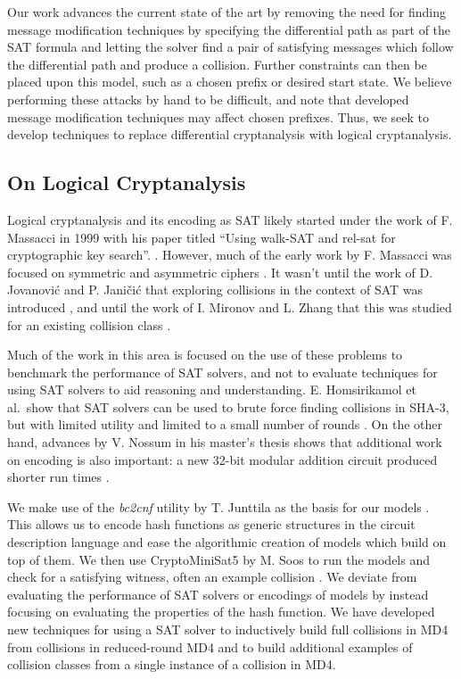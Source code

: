 \documentclass[conference]{IEEEtran}
\begin{document}
Our work advances the current state of the art by removing the need for finding message modification techniques by
specifying the differential path as part of the SAT formula and letting the
solver find a pair of satisfying messages which follow the differential path
and produce a collision. Further constraints can then be placed upon this
model, such as a chosen prefix or desired start state. We believe performing
these attacks by hand to be difficult, and note that developed message
modification techniques may affect chosen prefixes. Thus, we seek to develop
techniques to replace differential cryptanalysis with logical cryptanalysis.


\subsection{On Logical Cryptanalysis}

Logical cryptanalysis and its encoding as SAT likely started under the work of
F. Massacci in 1999 with his paper titled ``Using walk-SAT and rel-sat for
cryptographic key search''. \cite{Massacci:1999:UWR:1624218.1624261}. However,
much of the early work by F. Massacci was focused on symmetric and asymmetric
ciphers
\cite{Massacci:1999:UWR:1624218.1624261, MASSACCI2000LogicalCA, FIORINI2003101}.
It wasn't until the work of D. Jovanovi{\'{c}} and P. Jani{\v{c}}i{\'{c}}
that exploring collisions in the context of SAT was introduced
\cite{LogicalAnalysis}, and until the work of I. Mironov and L. Zhang that
this was studied for an existing collision class \cite{Mironov2006}.

Much of the work in this area is focused on the use of these problems
to benchmark the performance of SAT solvers,
and not to evaluate techniques for using SAT solvers to aid reasoning and
understanding. E. Homsirikamol et al.\ show that SAT solvers can be used to
brute force finding collisions in SHA-3, but with limited utility and limited
to a small number of rounds \cite{Homsirikamol2012}. On the other hand,
advances by V. Nossum in his master's thesis shows that additional work on
encoding is also important: a new 32-bit modular addition circuit produced
shorter run times \cite{nossum_2012}.

We make use of the \textit{bc2cnf} utility by T. Junttila as the basis for
our models \cite{circuits}. This allows us to encode hash functions as generic
structures in the circuit description language and ease the algorithmic
creation of models which build on top of them. We then use CryptoMiniSat5 by
M. Soos to run the models and check for a satisfying witness, often an
example collision \cite{Soos:2009:ESS:1575471.1575502, CryptoMiniSat5}. We
deviate from evaluating the performance of SAT solvers or encodings of models
by instead focusing on evaluating the properties of the hash function. We have
developed new techniques for using a SAT solver to inductively build full
collisions in MD4 from collisions in reduced-round MD4 and to build additional
examples of collision classes from a single instance of a collision in MD4.
\end{document}
